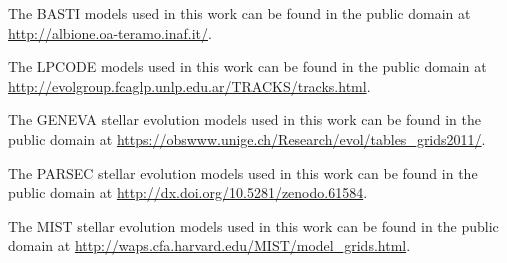 \documentclass[fleqn,usenatbib]{rasti}
\begin{document}
The BASTI models used in this work can be found in the public domain at \url{http://albione.oa-teramo.inaf.it/}.

The LPCODE models used in this work can be found in the public domain at \url{http://evolgroup.fcaglp.unlp.edu.ar/TRACKS/tracks.html}.

The GENEVA stellar evolution models used in this work can be found in the public domain at \url{https://obswww.unige.ch/Research/evol/tables_grids2011/}.

The PARSEC stellar evolution models used in this work can be found in the public domain at \url{http://dx.doi.org/10.5281/zenodo.61584}.

The MIST stellar evolution models used in this work can be found in the public domain at \url{http://waps.cfa.harvard.edu/MIST/model_grids.html}.













\bsp	%
\label{lastpage}
\end{document}
